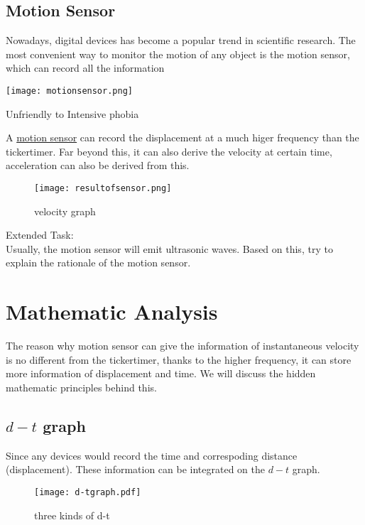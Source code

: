 \documentclass[a4paper]{tufte-handout}
\newenvironment{TaskBox} %
{\begin{tcolorbox}[breakable,colback=b1!30,colframe=b1,title=Task]} {\end{tcolorbox}}
\begin{document}
\subsection{Motion Sensor}
Nowadays, digital devices has become a popular trend in scientific research. The most convenient way to monitor the motion of any object is the motion sensor, which can record all the information
\begin{marginfigure}
\texttt{[image: motionsensor.png]}
\caption{Unfriendly to Intensive phobia}
\end{marginfigure}
A \href{https://www.vernier.com/product/motion-detector/#:~:text=The%20Motion%20Detector%20uses%20ultrasound%20to%20measure%20the,quality%20data%20for%20studying%20dynamics%20carts%20on%20tracks.}{motion sensor} can record the displacement at a much higer frequency than the tickertimer. Far beyond this, it can also derive the velocity at certain time, acceleration can also be derived from this.
\begin{figure}[h]
\texttt{[image: resultofsensor.png]}
\caption{velocity graph}
\label{fig:sensor result}
\end{figure}

\begin{TaskBox}
Extended Task:\\
Usually, the motion sensor will emit ultrasonic waves. Based on this, try to explain the rationale of the motion sensor. 
\end{TaskBox}

\section{Mathematic Analysis}
The reason why motion sensor can give the information of instantaneous velocity is no different from the tickertimer, thanks to the higher frequency, it can store more information of displacement and time. We will discuss the hidden mathematic principles behind this.

\subsection{$d-t$ graph}
Since any devices would record the time and correspoding distance (displacement). These information can be integrated on the $d-t$ graph.
\begin{figure*}[h]
\texttt{[image: d-tgraph.pdf]}
\caption{three kinds of d-t}
\label{fig:3 motions}
\end{figure*}
\end{document}
